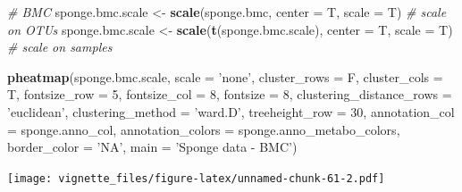 \documentclass[]{book}
\newenvironment{Shaded}{\begin{snugshade}}{\end{snugshade}}
\newcommand{\KeywordTok}[1]{\textcolor[rgb]{0.13,0.29,0.53}{\textbf{#1}}}
\newcommand{\DataTypeTok}[1]{\textcolor[rgb]{0.13,0.29,0.53}{#1}}
\newcommand{\DecValTok}[1]{\textcolor[rgb]{0.00,0.00,0.81}{#1}}
\newcommand{\StringTok}[1]{\textcolor[rgb]{0.31,0.60,0.02}{#1}}
\newcommand{\CommentTok}[1]{\textcolor[rgb]{0.56,0.35,0.01}{\textit{#1}}}
\newcommand{\NormalTok}[1]{#1}
\begin{document}
\begin{Shaded}
\begin{Highlighting}[]
\CommentTok{# BMC }
\NormalTok{sponge.bmc.scale <-}\StringTok{ }\KeywordTok{scale}\NormalTok{(sponge.bmc, }\DataTypeTok{center =}\NormalTok{ T, }\DataTypeTok{scale =}\NormalTok{ T) }
\CommentTok{# scale on OTUs}
\NormalTok{sponge.bmc.scale <-}\StringTok{ }\KeywordTok{scale}\NormalTok{(}\KeywordTok{t}\NormalTok{(sponge.bmc.scale), }\DataTypeTok{center =}\NormalTok{ T, }\DataTypeTok{scale =}\NormalTok{ T) }
\CommentTok{# scale on samples}

\KeywordTok{pheatmap}\NormalTok{(sponge.bmc.scale, }
         \DataTypeTok{scale =} \StringTok{'none'}\NormalTok{, }
         \DataTypeTok{cluster_rows =}\NormalTok{ F, }
         \DataTypeTok{cluster_cols =}\NormalTok{ T, }
         \DataTypeTok{fontsize_row =} \DecValTok{5}\NormalTok{, }\DataTypeTok{fontsize_col =} \DecValTok{8}\NormalTok{,}
         \DataTypeTok{fontsize =} \DecValTok{8}\NormalTok{,}
         \DataTypeTok{clustering_distance_rows =} \StringTok{'euclidean'}\NormalTok{,}
         \DataTypeTok{clustering_method =} \StringTok{'ward.D'}\NormalTok{,}
         \DataTypeTok{treeheight_row =} \DecValTok{30}\NormalTok{,}
         \DataTypeTok{annotation_col =}\NormalTok{ sponge.anno_col,}
         \DataTypeTok{annotation_colors =}\NormalTok{ sponge.anno_metabo_colors,}
         \DataTypeTok{border_color =} \StringTok{'NA'}\NormalTok{,}
         \DataTypeTok{main =} \StringTok{'Sponge data - BMC'}\NormalTok{)}
\end{Highlighting}
\end{Shaded}

\texttt{[image: vignette\_files/figure-latex/unnamed-chunk-61-2.pdf]}
\end{document}

